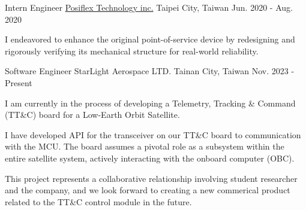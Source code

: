 

\begin{cventries}

  \cventry
    {Intern Engineer} %
    {\href{https://www.posiflex.com/en-global}{Posiflex Technology inc.}} %
    {Taipei City, Taiwan} %
    {Jun. 2020 - Aug. 2020} %
    {
      \begin{cvitems} %
        \item {I endeavored to enhance the original point-of-service device by redesigning and rigorously verifying its mechanical structure for real-world reliability.}
      \end{cvitems}
    }

  \cventry
    {Software Engineer} %
    {StarLight Aerospace LTD.} %
    {Tainan City, Taiwan} %
    {Nov. 2023 - Present} %
    {
      \begin{cvitems} %
        \item {I am currently in the process of developing a Telemetry, Tracking \& Command (TT\&C) board for a Low-Earth Orbit Satellite.}
        \item{I have developed API for the transceiver on our TT\&C board to communication with the MCU. The board assumes a pivotal role as a subsystem within the entire satellite system, actively interacting with the onboard computer (OBC).}
        \item{This project represents a collaborative relationship involving student researcher and the company, and we look forward to creating a new commerical product related to the TT\&C control module in the future.}
      \end{cvitems}
    }
    
\end{cventries}
